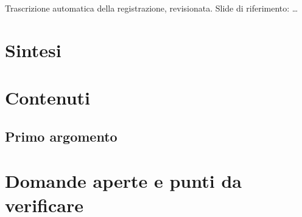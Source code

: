 \label{lez:AAAA-MM-GG}

\begin{nota}[Fonte]
Trascrizione automatica della registrazione, revisionata. Slide di riferimento: \ldots
\end{nota}

\section{Sintesi}

\section{Contenuti}

\subsection{Primo argomento}

\begin{esame}
\end{esame}

\section{Domande aperte e punti da verificare}
\begin{verifica}
\end{verifica}
